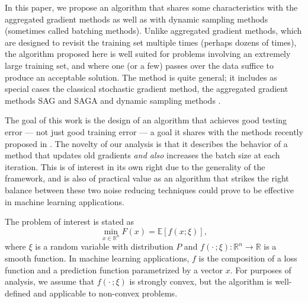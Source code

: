\documentclass[11pt]{article}
\begin{document}
In this paper, we propose an algorithm that shares some characteristics with the aggregated gradient methods as well as with dynamic sampling methods (sometimes called batching methods). Unlike aggregated gradient methods, which are designed to revisit the training set multiple times (perhaps dozens of times), the algorithm proposed here is well suited for problems involving an extremely large training set, and where one (or a few) passes over the data suffice to produce an acceptable solution. The method is quite general; it includes as special cases  the classical stochastic gradient method, the aggregated gradient methods SAG \cite{NIPS2014_5258} and SAGA \cite{NIPS2014_5258} and  dynamic sampling methods \cite{dss,FS2011,2014pasglyetal}. 

The goal  of this work is the design of an algorithm that achieves good testing error --- not just good training error --- a goal it shares with the methods recently proposed in \cite{frostig2014competing,babanezhad2015stop}. {\color{blue} The  novelty of our analysis is that it describes the behavior of a method that  updates old gradients \emph{and also}  increases the batch size at each iteration. This is of interest in its own right due to the generality of the framework, and is also of practical value as an algorithm that strikes the right balance between these two noise reducing techniques could prove to be  effective in machine learning applications.}


The problem of interest is stated as
\begin{equation}  \label{risk}
	\min_{x \in \mathbb{R}^n} F(x) = \mathbb{E}[ f(x;\xi)] ,
\end{equation}
where $\xi$ is a random variable with distribution $P$ and $f(\cdot\,; \xi): \mathbb{R}^n \rightarrow \mathbb{R}$  is a smooth function. In machine learning applications, $f$ is the composition of a  loss function and a prediction function parametrized by a vector $x$. 
For purposes of analysis, we assume that $f(\cdot\,; \xi)$ is strongly convex, but the algorithm is  well-defined and applicable to non-convex problems. 
\end{document}
